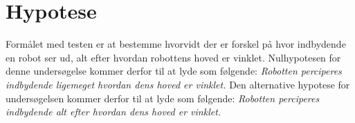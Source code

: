 \section*{Hypotese}
\label{Hypotese}
%
Formålet med testen er at bestemme hvorvidt der er forskel på hvor indbydende en robot ser ud, alt efter hvordan robottens hoved er vinklet. Nulhypotesen for denne undersøgelse kommer derfor til at lyde som følgende:\blankline
%
\textit{Robotten perciperes indbydende ligemeget hvordan dens hoved er vinklet.}\blankline
%
Den alternative hypotese for undersøgelsen kommer derfor til at lyde som følgende:\blankline
%
\textit{Robotten perciperes indbydende alt efter hvordan dens hoved er vinklet.}
